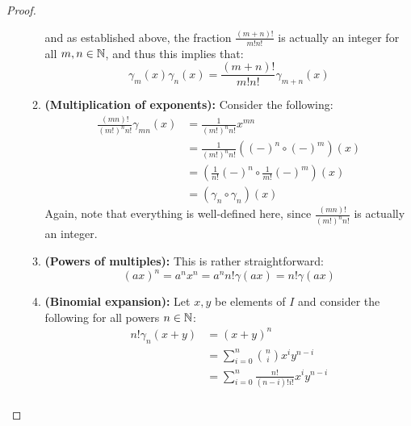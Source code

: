 \begin{proof}
\begin{enumerate}
\begin{enumerate}
                                    and as established above, the fraction $\frac{(m + n)!}{m!n!}$ is actually an integer for all $m, n \in \N$, and thus this implies that:
                                        $$\gamma_m(x)\gamma_n(x) = \frac{(m + n)!}{m!n!}\gamma_{m + n}(x)$$
                                    \item \textbf{(Multiplication of exponents):} Consider the following:
                                        $$
                                            \begin{aligned}
                                                \frac{(mn)!}{(m!)^n n!}\gamma_{mn}(x) & = \frac{1}{(m!)^n n!} x^{mn}
                                                \\
                                                & = \frac{1}{(m!)^n n!} \left((-)^n \circ (-)^m\right)(x)
                                                \\
                                                & = \left(\frac{1}{n!}(-)^n \circ \frac{1}{m!}(-)^m\right)(x)
                                                \\
                                                & = (\gamma_n \circ \gamma_n)(x)
                                            \end{aligned}
                                        $$
                                    Again, note that everything is well-defined here, since $\frac{(mn)!}{(m!)^n n!}$ is actually an integer.
                                    \item \textbf{(Powers of multiples):} This is rather straightforward:
                                        $$(ax)^n = a^n x^n = a^n n! \gamma(ax) = n!\gamma(ax)$$
                                    \item \textbf{(Binomial expansion):} Let $x, y$ be elements of $I$ and consider the following for all powers $n \in \N$:
                                        $$
                                            \begin{aligned}
                                                n!\gamma_n(x + y) & = (x + y)^n
                                                \\
                                                & = \sum_{i=0}^n \binom{n}{i} x^i y^{n - i}
                                                \\
                                                & = \sum_{i=0}^n \frac{n!}{(n - i)! i!} x^i y^{n - i}
                                                \\

\end{aligned}$$
\end{enumerate}
\end{enumerate}
\end{proof}
